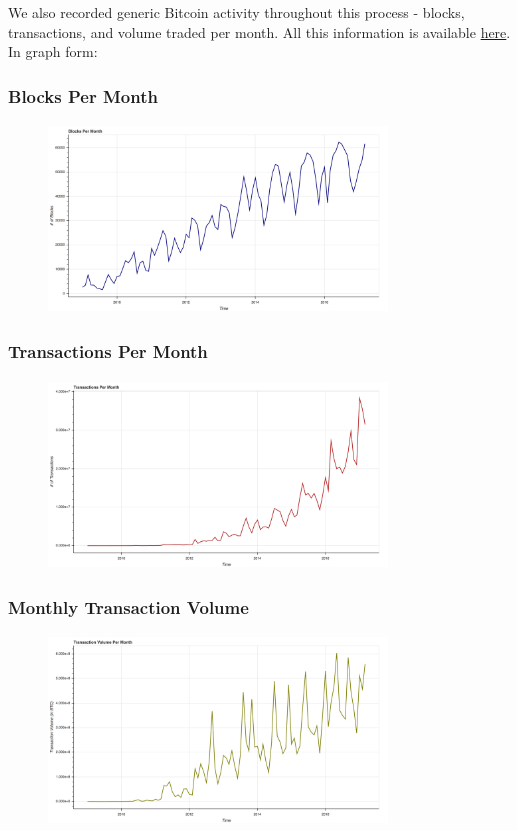 \documentclass[9pt,twocolumn,twoside]{idsi}
\begin{document}
We also recorded generic Bitcoin activity throughout this process - blocks, transactions, and volume traded per month. All this information is available \href{https://github.com/nishilshah17/idsi_bitcoin/blob/master/data/output/general/monthly_activity.txt}{here}. In graph form:

\subsubsection{Blocks Per Month}
\begin{figure}[!ht]
\includegraphics[width=9cm, height=5cm]{data/output/general/monthly_block_activity.png}
\end{figure}

\subsubsection{Transactions Per Month}
\begin{figure}[!ht]
\includegraphics[width=9cm, height=5cm]{data/output/general/monthly_transaction_activity.png}
\end{figure}

\subsubsection{Monthly Transaction Volume}
\begin{figure}[!ht]
\includegraphics[width=9cm, height=5cm]{data/output/general/monthly_transaction_volume.png}
\end{figure}
\end{document}
